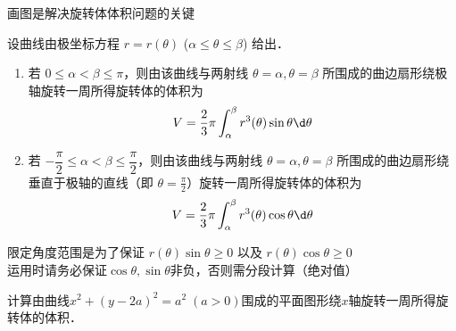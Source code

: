 \documentclass[12pt, a4paper, oneside, UTF8]{ctexbook}
\begin{document}
\begin{corollary}
\begin{enumerate}
\begin{center}
        \end{center}
    \end{enumerate}
\end{corollary}
\begin{myRemark}
    画图是解决旋转体体积问题的关键
\end{myRemark}
\begin{corollary}[极坐标下旋转体体积公式]
    设曲线由极坐标方程 $r=r(\theta)$ ($\alpha \le \theta \le \beta$) 给出．
    \begin{enumerate}
        \item 若 $0 \le \alpha < \beta \le \pi$，则由该曲线与两射线 $\theta=\alpha, \theta=\beta$ 所围成的曲边扇形绕极轴旋转一周所得旋转体的体积为
        \[
            V = \dfrac{2}{3}\pi \int_{\alpha}^{\beta} r^3(\theta) \sin \theta \d \theta
        \]
        \item 若 $-\dfrac{\pi}{2} \le \alpha < \beta \le \dfrac{\pi}{2}$，则由该曲线与两射线 $\theta=\alpha, \theta=\beta$ 所围成的曲边扇形绕垂直于极轴的直线（即 $\theta=\frac{\pi}{2}$）旋转一周所得旋转体的体积为
        \[
            V = \dfrac{2}{3}\pi \int_{\alpha}^{\beta} r^3(\theta) \cos \theta \d \theta
        \]
    \end{enumerate}
    \begin{myRemark}
        限定角度范围是为了保证 $r(\theta) \sin \theta \ge 0$ 以及 $r(\theta) \cos \theta \ge 0$\\
        运用时请务必保证$\cos \theta ,\sin \theta$非负，否则需分段计算（绝对值）
    \end{myRemark}
\end{corollary}
\begin{example}
    计算由曲线$x^2+(y-2a)^2=a^2\;(a>0)$围成的平面图形绕$x$轴旋转一周所得旋转体的体积．
\end{example}
\end{document}

